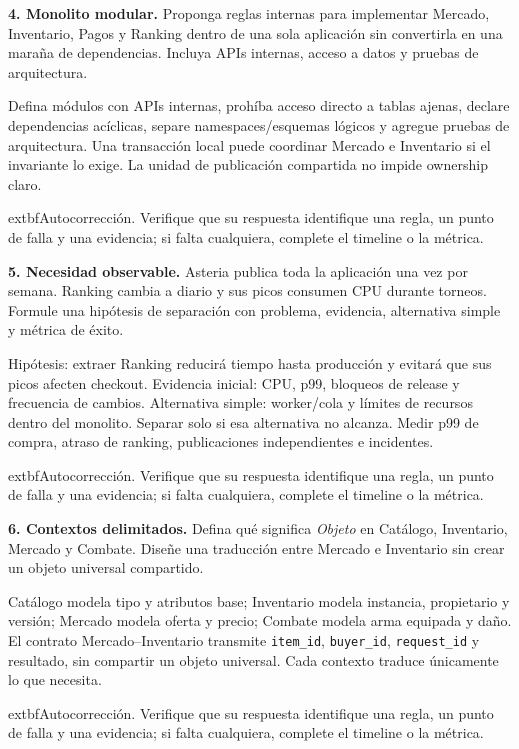 \documentclass[variant=guiaresuelta,cover=institutional,mode=screen]{ua-engineering-v6-article}
\begin{document}
\begin{uaexercise}
\textbf{4. Monolito modular.} Proponga reglas internas para implementar Mercado, Inventario, Pagos y Ranking dentro de una sola aplicación sin convertirla en una maraña de dependencias. Incluya APIs internas, acceso a datos y pruebas de arquitectura.
\end{uaexercise}
\begin{uaanswer}
Defina módulos con APIs internas, prohíba acceso directo a tablas ajenas, declare dependencias acíclicas, separe namespaces/esquemas lógicos y agregue pruebas de arquitectura. Una transacción local puede coordinar Mercado e Inventario si el invariante lo exige. La unidad de publicación compartida no impide ownership claro.
\par\smallskip	extbf{Autocorrección.} Verifique que su respuesta identifique una regla, un punto de falla y una evidencia; si falta cualquiera, complete el timeline o la métrica.
\end{uaanswer}
\begin{uaexercise}
\textbf{5. Necesidad observable.} Asteria publica toda la aplicación una vez por semana. Ranking cambia a diario y sus picos consumen CPU durante torneos. Formule una hipótesis de separación con problema, evidencia, alternativa simple y métrica de éxito.
\end{uaexercise}
\begin{uaanswer}
Hipótesis: extraer Ranking reducirá tiempo hasta producción y evitará que sus picos afecten checkout. Evidencia inicial: CPU, p99, bloqueos de release y frecuencia de cambios. Alternativa simple: worker/cola y límites de recursos dentro del monolito. Separar solo si esa alternativa no alcanza. Medir p99 de compra, atraso de ranking, publicaciones independientes e incidentes.
\par\smallskip	extbf{Autocorrección.} Verifique que su respuesta identifique una regla, un punto de falla y una evidencia; si falta cualquiera, complete el timeline o la métrica.
\end{uaanswer}
\begin{uaexercise}
\textbf{6. Contextos delimitados.} Defina qué significa \emph{Objeto} en Catálogo, Inventario, Mercado y Combate. Diseñe una traducción entre Mercado e Inventario sin crear un objeto universal compartido.
\end{uaexercise}
\begin{uaanswer}
Catálogo modela tipo y atributos base; Inventario modela instancia, propietario y versión; Mercado modela oferta y precio; Combate modela arma equipada y daño. El contrato Mercado--Inventario transmite \texttt{item\_id}, \texttt{buyer\_id}, \texttt{request\_id} y resultado, sin compartir un objeto universal. Cada contexto traduce únicamente lo que necesita.
\par\smallskip	extbf{Autocorrección.} Verifique que su respuesta identifique una regla, un punto de falla y una evidencia; si falta cualquiera, complete el timeline o la métrica.
\end{uaanswer}
\end{document}
